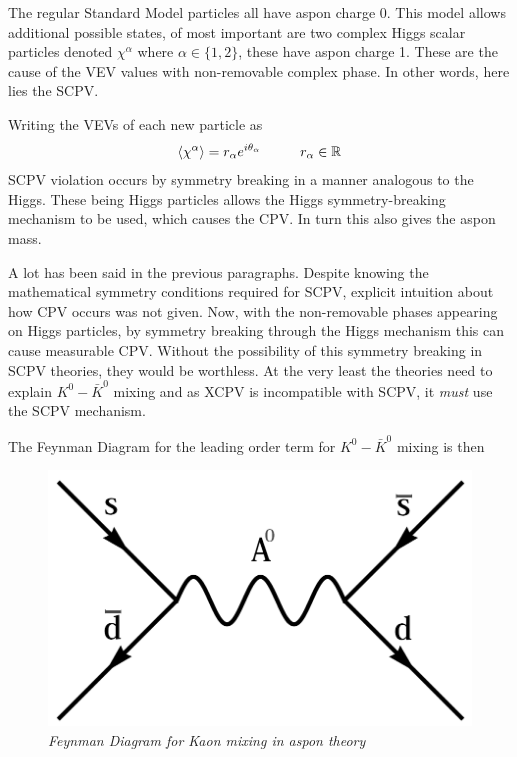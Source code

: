 The regular Standard Model particles all have aspon charge 0. This model allows additional possible states, of most important are two complex Higgs scalar particles denoted $\chi^\alpha$ where $\alpha \in \{1,2\}$, these have aspon charge 1. These are the cause of the VEV values with non-removable complex phase. In other words, here lies the SCPV.

Writing the VEVs of each new particle as
\begin{align*}
\braket{\chi^\alpha}=r_\alpha e^{i \theta_\alpha}\hspace{10mm}r_\alpha \in \mathbb{R}
\end{align*}
SCPV violation occurs by symmetry breaking in a manner analogous to the Higgs. These being Higgs particles allows the Higgs symmetry-breaking mechanism to be used, which causes the CPV. In turn this also gives the aspon mass.

A lot has been said in the previous paragraphs. Despite knowing the mathematical symmetry conditions required for SCPV, explicit intuition about how CPV occurs was not given. Now, with the non-removable phases appearing on Higgs particles, by symmetry breaking through the Higgs mechanism this can cause measurable CPV. Without the possibility of this symmetry breaking in SCPV theories, they would be worthless. At the very least the theories need to explain $K^0-\bar{K}^0$ mixing and as XCPV is incompatible with SCPV, it \textit{must} use the SCPV mechanism.

The Feynman Diagram for the leading order term for $K^0-\bar{K}^0$ mixing is then
\begin{figure}[h!]
\begin{center}
\includegraphics[scale=0.4]{figs/aspon_kaon.png}
\end{center}
\caption{\textit{Feynman Diagram for Kaon mixing in aspon theory }}
\label{asponkaon}
\end{figure}


